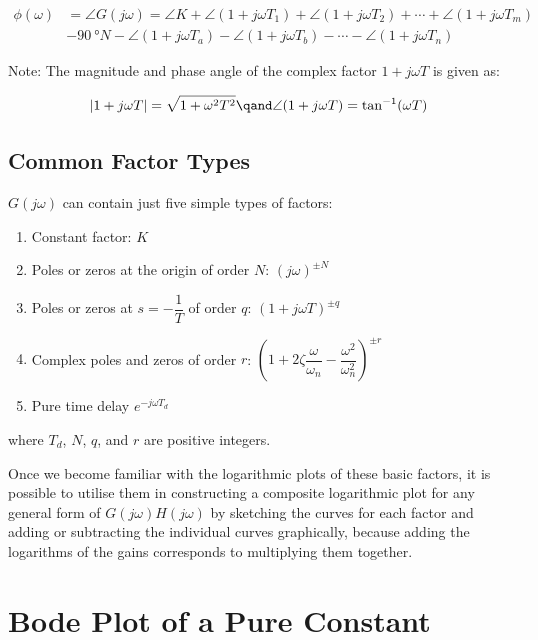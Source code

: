 \documentclass[
  14pt,
  a4paper,
  oneside,
  open=any,
  a4paper,
  14pt]{report}
\begin{document}
\[
\begin{aligned}
    \phi(\omega) &= \angle G(j\omega) = \angle K + \angle (1+j\omega T_1) + \angle (1+j\omega T_2) + \cdots+ \angle (1+j\omega T_m) \\
    &-\SI{90}{\degree}N - \angle(1+j\omega T_a) - \angle(1+j\omega T_b) - \cdots - \angle(1+j\omega T_n)
\end{aligned}
\]

Note: The magnitude and phase angle of the complex factor
\(1+j\omega T\) is given as:

\[
    \abs{1+j\omega T} = \sqrt{1+\omega^2 T^2}\qand \angle(1+j\omega T) = \tan^{-1}(\omega T)
\]

\subsection{Common Factor Types}\label{common-factor-types}

\(G(j\omega)\) can contain just five simple types of factors:

\begin{enumerate}
\def\labelenumi{\arabic{enumi}.}
\item
  Constant factor: \(K\)
\item
  Poles or zeros at the origin of order \(N\): \((j\omega)^{\pm N}\)
\item
  Poles or zeros at \(s=-\dfrac{1}{T}\) of order \(q\):
  \((1+j\omega T)^{\pm q}\)
\item
  Complex poles and zeros of order \(r\):
  \(\left(1+ 2\zeta \dfrac{\omega}{\omega_n} - \dfrac{\omega^2}{\omega_n^2} \right)^{\pm r}\)
\item
  Pure time delay \(e^{-j\omega T_d}\)
\end{enumerate}

where \(T_d\), \(N\), \(q\), and \(r\) are positive integers.

Once we become familiar with the logarithmic plots of these basic
factors, it is possible to utilise them in constructing a composite
logarithmic plot for any general form of \(G(j\omega)H(j\omega)\) by
sketching the curves for each factor and adding or subtracting the
individual curves graphically, because adding the logarithms of the
gains corresponds to multiplying them together.

\section{Bode Plot of a Pure
Constant}\label{bode-plot-of-a-pure-constant}
\end{document}
